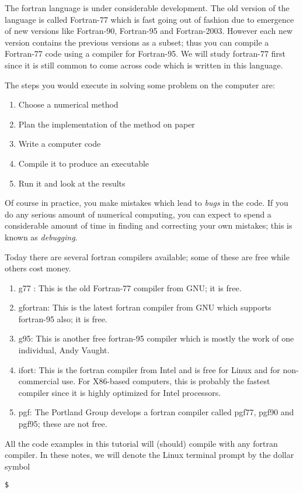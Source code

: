 \documentclass[11pt,oneside]{amsart}
\begin{document}
The fortran language is under considerable development. The old version of the language is called Fortran-77 which is fast going out of fashion due to emergence of new versions like Fortran-90, Fortran-95 and Fortran-2003. However each new version contains the previous versions as a subset; thus you can compile a Fortran-77 code using a compiler for Fortran-95. We will study fortran-77 first since it is still common to come across code which is written in this language.

The steps you would execute in solving some problem on the computer are:

\begin{enumerate}
\item Choose a numerical method
\item Plan the implementation of the method on paper
\item Write a computer code
\item Compile it to produce an executable
\item Run it and look at the results
\end{enumerate}

Of course in practice, you make mistakes which lead to {\em bugs} in the code. If you do any serious amount of numerical computing, you can expect to spend a considerable amount of time in finding and correcting your own mistakes; this is known as {\em debugging}. 

Today there are several fortran compilers available; some of these are free while others cost money.

\begin{enumerate}
\item g77 : This is the old Fortran-77 compiler from GNU; it is free.
\item gfortran: This is the latest fortran compiler from GNU which supports fortran-95 also; it is free.
\item g95: This is another free fortran-95 compiler which is mostly the work of one individual, Andy Vaught.
\item ifort: This is the fortran compiler from Intel and is free for Linux and for non-commercial use. For X86-based computers, this is probably the fastest compiler since it is highly optimized for Intel processors.
\item pgf: The Portland Group develops a fortran compiler called pgf77, pgf90 and pgf95; these are not free.
\end{enumerate}

All the code examples in this tutorial will (should) compile with any fortran compiler.  In these notes, we will denote the Linux terminal prompt by the dollar symbol
\begin{verbatim}
$
\end{verbatim}
\end{document}
